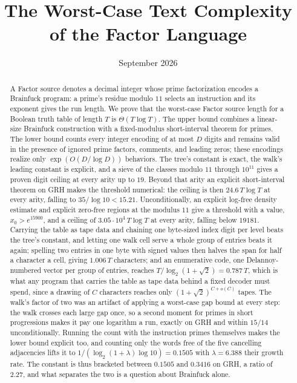 \documentclass[11pt]{article}
\title{The Worst-Case Text Complexity of the Factor Language}
\author{\shortstack{Bangyen Pham\\
\small Independent Researcher\\
\small\href{mailto:bangyenp@gmail.com}{\texttt{bangyenp@gmail.com}}\\
\small\href{https://orcid.org/0009-0006-9928-2088}{ORCID: 0009-0006-9928-2088}}}
\date{September 2026}
\theoremstyle{remark}
\begin{document}
\maketitle

\begin{abstract}
A Factor source denotes a decimal integer whose prime
factorization encodes a Brainfuck program: a prime's residue modulo $11$
selects an instruction and its exponent gives the run length.  We prove that
the worst-case Factor source length for a Boolean truth table of length $T$ is
$\Theta(T\log T)$.  The upper bound combines a linear-size Brainfuck
construction with a fixed-modulus short-interval theorem for primes.  The
lower bound counts every integer encoding of at most $D$ digits and remains
valid in the presence of ignored prime factors, comments, and leading zeros;
these encodings realize only $\exp(O(D/\log D))$ behaviors.  The tree's
constant is exact, the walk's leading constant is explicit, and a sieve of
the classes modulo $11$ through $10^{11}$ gives a proven digit ceiling at
every arity up to $19$.  Beyond that arity an explicit short-interval
theorem on GRH makes the threshold numerical: the ceiling is then
$24.6\,T\log T$ at every arity, falling to $35/\log 10<15.21$.
Unconditionally, an explicit log-free density estimate and explicit
zero-free regions at the modulus $11$ give a threshold with a value,
$x_0>e^{15900}$, and a ceiling of $3.05\cdot10^4\,T\log T$ at every arity,
falling below $19181$.  Carrying the
table as tape data and chaining one byte-sized index digit per level beats
the tree's constant, and letting one walk cell serve a whole group of
entries beats it again; spelling two entries in one byte with signed values
then halves the span for half a character a cell, giving $1.006\,T$
characters; and an enumerative code, one Delannoy-numbered vector per group
of entries, reaches $T/\log_2(1+\sqrt2)=0.787\,T$, which is what any program
that carries the table as tape data behind a fixed decoder must spend, since
a drawing of $C$ characters reaches only $(1+\sqrt2)^{C+o(C)}$ tapes.  The
walk's factor of two was an artifact of applying a worst-case gap bound at
every step: the walk crosses each large gap once, so a second moment for
primes in short progressions makes it pay one logarithm a run, exactly on
GRH and within $15/14$ unconditionally.  Running the count with the
instruction primes themselves makes the lower bound explicit too, and
counting only the words free of the five cancelling adjacencies lifts it to
$1/(\log_2(1+\lambda)\log10)=0.1505$ with $\lambda=6.388$ their growth rate.
The constant is thus bracketed between $0.1505$ and $0.3416$ on GRH, a ratio
of $2.27$, and what separates the two is a question about Brainfuck alone.
\end{abstract}
\end{document}
